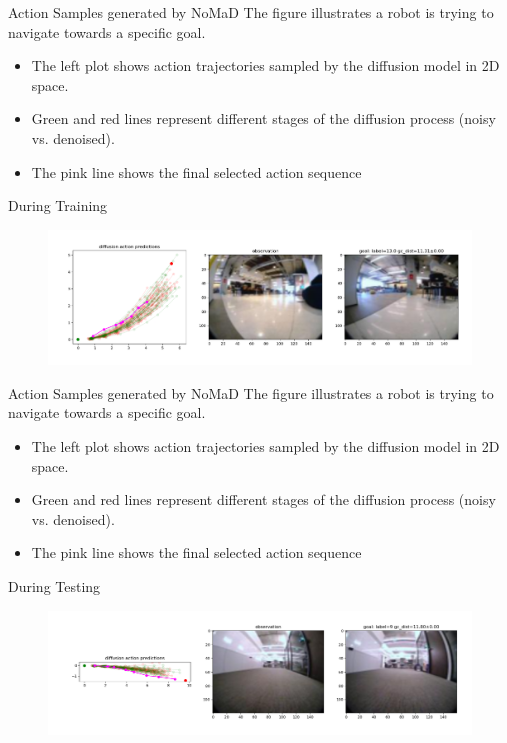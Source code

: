 \documentclass{beamer}
\begin{document}
\begin{frame}{Action Samples generated by NoMaD}
The figure illustrates a robot is trying to navigate towards a specific goal.\\
\begin{itemize}
    \item The left plot shows action trajectories sampled by the diffusion model in 2D space.
    \item Green and red lines represent different stages of the diffusion process (noisy vs. denoised).
    \item The pink line shows the final selected action sequence
\end{itemize}    
    \begin{block}{During Training}
        \begin{figure}
            \includegraphics[width=1\linewidth]{images/train_action_samples_2.png}        \end{figure}
    \end{block}
\end{frame}
\begin{frame}{Action Samples generated by NoMaD}
    The figure illustrates a robot is trying to navigate towards a specific goal.\\
    \begin{itemize}
        \item The left plot shows action trajectories sampled by the diffusion model in 2D space.
        \item Green and red lines represent different stages of the diffusion process (noisy vs. denoised).
        \item The pink line shows the final selected action sequence
    \end{itemize}    
    \begin{block}{During Testing}
        \begin{figure}
            \includegraphics[width=1\linewidth]{images/sacson_test_action_samples_1.png}        \end{figure}
    \end{block}
\end{frame}
\end{document}
